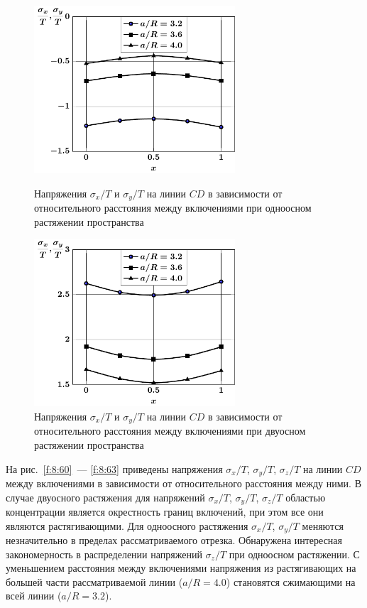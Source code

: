 \begin{figure}[h!]
\centering\footnotesize
\parbox[b]{7.5cm}{\centering\includegraphics[width=7.5cm]{inc5-a-d95-g25-t1-cd-sig_x.pdf}
\caption{Напряжения $\sigma_x/T$ и $\sigma_y/T$ на линии  $CD$ в зависимости от относительного расстояния между включениями при одноосном растяжении пространства
\label{f:8:60}}}\hfil\hfil
\parbox[b]{7.5cm}{\centering\includegraphics[width=7.5cm]{inc5-a-d95-g25-t2-cd-sig_x.pdf}
\caption{Напряжения $\sigma_x/T$ и $\sigma_y/T$ на линии  $CD$ в зависимости от относительного расстояния между включениями при двуосном растяжении пространства
\label{f:8:61}}}
\end{figure}

На рис.~\ref{f:8:60}~--- \ref{f:8:63} приведены напряжения $\sigma_x/T$, $\sigma_y/T$, $\sigma_z/T$ на линии $CD$ между включениями в зависимости от относительного расстояния между ними. В случае двуосного растяжения для напряжений $\sigma_x/T$, $\sigma_y/T$, $\sigma_z/T$ областью концентрации является окрестность границ включений, при этом все они являются растягивающими. Для одноосного растяжения $\sigma_x/T$, $\sigma_y/T$ меняются незначительно в пределах рассматриваемого отрезка. Обнаружена интересная закономерность в распределении напряжений $\sigma_z/T$ при одноосном растяжении. С уменьшением расстояния между включениями напряжения из растягивающих на большей части рассматриваемой линии ($a/R=4.0$) становятся сжимающими на всей линии ($a/R=3.2$).

